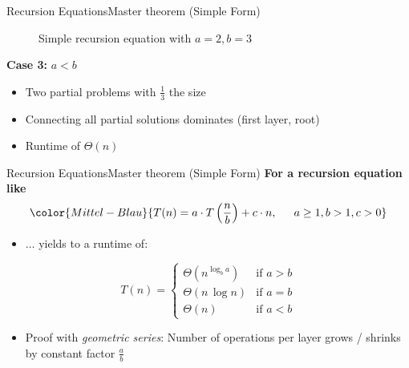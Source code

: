 
\begin{frame}{Recursion Equations}{Master theorem (Simple Form)}
  \begin{figure}[!h]
    \begin{adjustbox}{width=\linewidth}
      \def\AlgoREDivide{2}%
      \def\AlgoRESize{0.33}%
      \def\AlgoREScale{15}%
      
    \end{adjustbox}
    \caption{Simple recursion equation with {\color{Mittel-Blau}$a = 2, b = 3$}}
    \label{fig:recursion_equations:master_theorem_tree_2_3}
  \end{figure}
  \textbf{Case 3:} {\color{Mittel-Blau}$a < b$}
  \begin{itemize}
    \item<3->
      Two partial problems with $\frac{1}{3}$ the size
    \item<4->
      Connecting all partial solutions dominates (first layer, root)
    \item<5->
      Runtime of {\color{Mittel-Blau}$\Theta(n)$}
  \end{itemize}
\end{frame}


\begin{frame}{Recursion Equations}{Master theorem (Simple Form)}
  \textbf{For a recursion equation like}
  \begin{displaymath}
    \color{Mittel-Blau}{%
      T(n) = a \cdot T\left(\frac{n}{b}\right) + c \cdot n,%
      \hspace{1.5em}a \geq 1, b > 1, c > 0%
    }%
  \end{displaymath}
  \vspace{-1.0em}
  \begin{itemize}
    \item<2->
      $\ldots$ yields to a runtime of:
  \end{itemize}
  \begin{displaymath}
    T(n) = \begin{cases}
      \Theta(n^{\log_b a}) & \text{if } a > b\\
      \Theta(n \, \log n) & \text{if } a = b\\
      \Theta(n) & \text{if } a < b
    \end{cases}
  \end{displaymath}
  \begin{itemize}
    \item<4->
      Proof with \textit{geometric series}:
      Number of operations per layer grows / shrinks by constant factor
      $\tfrac{a}{b}$
  \end{itemize}
\end{frame}

